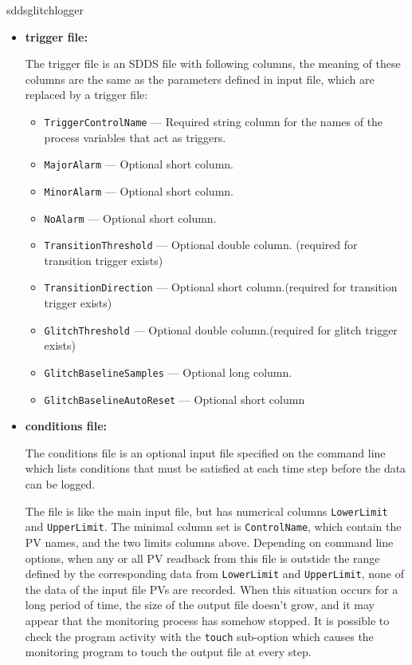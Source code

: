 \begin{sddsprog}{sddsglitchlogger}
\begin{itemize}
\begin{itemize}
  \end{itemize}
  \item \textbf{trigger file:}\par
The trigger file is an SDDS file with following columns, the meaning of these columns are the same as
the parameters defined in input file, which are replaced by a trigger file:
  \begin{itemize}
    \item {\tt TriggerControlName} --- Required string column for the names of the process variables
                that act as triggers.
    \item {\tt MajorAlarm} --- Optional short column.
    \item {\tt MinorAlarm} --- Optional short column.
    \item {\tt NoAlarm} --- Optional short column.
    \item {\tt TransitionThreshold} --- Optional double column. (required for transition trigger exists)
    \item {\tt TransitionDirection} --- Optional short column.(required for transition trigger exists)
    \item {\tt GlitchThreshold} --- Optional double column.(required for glitch trigger exists)
    \item {\tt GlitchBaselineSamples} --- Optional long column.
    \item {\tt GlitchBaselineAutoReset} --- Optional short column
  \end{itemize}
  \item \textbf{conditions file:} \par
The conditions file is an optional input file specified on the command line which lists
conditions that must be satisfied at each time step before the data can be logged.

The file is like the main input file, but has numerical columns \verb+LowerLimit+ and \verb+UpperLimit+.
The minimal column set is \verb+ControlName+, which contain the PV names, and the two limits columns above.
Depending on command line options, when any or all PV readback from this file
is outstide the range defined by the corresponding data from \verb+LowerLimit+ and \verb+UpperLimit+,
none of the data of the input file PVs are recorded.
When this situation occurs for a long period of time, the size of the output file doesn't
grow, and it may appear that the monitoring process has somehow stopped.
It is possible to check the program activity with the \verb+touch+ sub-option
which causes the monitoring program to touch the output file at every step.


\end{itemize}
\end{sddsprog}
